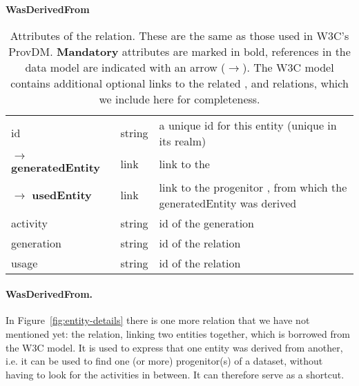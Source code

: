 \begin{table}[h]

\small
{}\textwidth

\textbf{\normalsize WasDerivedFrom}\vspace{0.25em}\\
\begin{tabulary}{1.0\textwidth}{@{}lp{3cm}L@{}}
\toprule
{} &    & \\
\midrule
id               & string            & a unique id for this entity (unique in its realm)\\
$\rightarrow$ \textbf{generatedEntity} & link      & link to the \\
$\rightarrow$ \textbf{usedEntity}      & link      & link to the progenitor , from which the generatedEntity was derived\\
activity         & string            & id of the generation \\
generation       & string            & id of the  relation\\
usage            & string            & id of the  relation\\
\bottomrule
\end{tabulary}
\caption[Attributes of the  relation]{Attributes of the
 relation. These are the same as those used in W3C's
ProvDM. \textbf{Mandatory} attributes are marked in bold, references in the data
model are indicated with an arrow ($\rightarrow$). The W3C model contains
additional optional links to the related ,
 and  relations, which we include here for
completeness.
}\label{tab:wasderivedfrom-attributes}
\end{table}


\paragraph{WasDerivedFrom.}
In Figure~\ref{fig:entity-details} there is one more relation that we have not
mentioned yet: the  relation, linking two entities
together, which is borrowed from the W3C model. It is used to express that one
entity was derived from another, i.e. it can be used to find one (or more)
progenitor(s) of a dataset, without having to look for the activities in
between. It can therefore serve as a shortcut.

